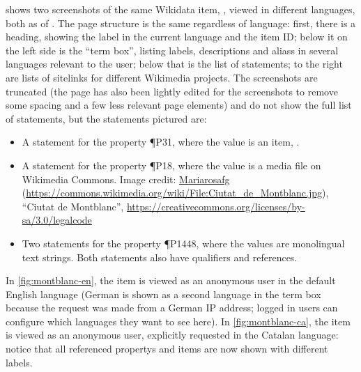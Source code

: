  shows two screenshots of the same \gls{Wikidata} \gls{item},
, viewed in different languages,
both as of .
The page structure is the same regardless of language:
first, there is a heading, showing the \gls{label} in the current language and the \gls{item ID};
below it on the left side is the “term box”,
listing \glspl{label}, \glspl{description} and \glspl{alias} in several languages relevant to the user;
below that is the list of \glspl{statement};
to the right are lists of \glspl{sitelink} for different \gls{Wikimedia} projects.
The screenshots are truncated
(the page has also been lightly edited for the screenshots
to remove some spacing and a few less relevant page elements)
and do not show the full list of \glspl{statement},
but the \glspl{statement} pictured are:
\begin{itemize}
\item A \gls{statement} for the \gls{property} \P{P31},
  where the value is an \gls{item}, .
\item A \gls{statement} for the \gls{property} \P{P18},
  where the value is a media file on \gls{Wikimedia Commons}.
  Image credit:
  \href{https://commons.wikimedia.org/wiki/User:Mariarosafg}{Mariarosafg}
  (\url{https://commons.wikimedia.org/wiki/File:Ciutat_de_Montblanc.jpg}),
  “Ciutat de Montblanc”,
  \url{https://creativecommons.org/licenses/by-sa/3.0/legalcode}
\item Two \glspl{statement} for the \gls{property} \P{P1448},
  where the values are monolingual text strings.
  Both \glspl{statement} also have \glspl{qualifier} and \glspl{reference}.
\end{itemize}
In \cref{fig:montblanc-en},
the \gls{item} is viewed as an anonymous user in the default English language
(German is shown as a second language in the term box
because the request was made from a German IP address;
logged in users can configure which languages they want to see here).
In \cref{fig:montblanc-ca},
the \gls{item} is viewed as an anonymous user, explicitly requested in the Catalan language:
notice that all referenced \glspl{property} and \glspl{item}
are now shown with different \glspl{label}.

